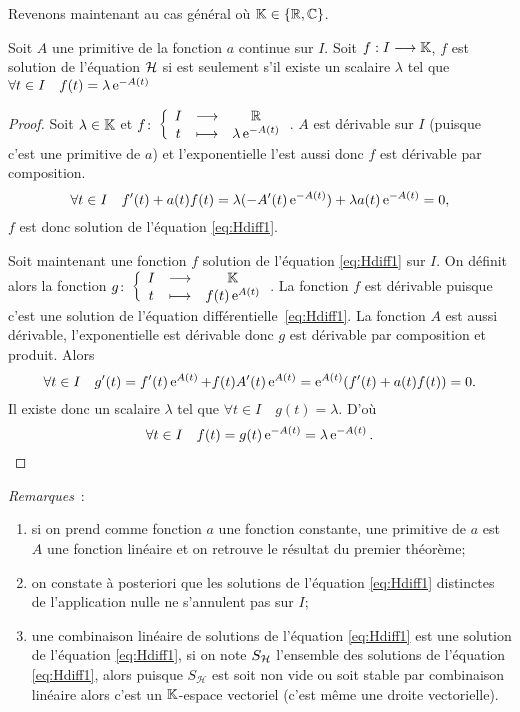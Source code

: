 Revenons maintenant au cas général où $\mathbb{K} \in \{\mathbb{R}, \mathbb{C}\}$.
%
\begin{theo}\label{theo:2}
Soit $A$ une primitive de la fonction $a$ continue sur $I$. Soit $f:I \longrightarrow \mathbb{K}$, $f$ est solution de l'équation $\mathcal{H}$ si est seulement s'il existe un scalaire $\lambda$ tel que $\forall t \in I \quad f(t)=\lambda \operatorname{e}^{-A(t)}$
\end{theo}
\begin{proof}
Soit $\lambda \in \mathbb{K}$ et $f\colon \left\{\begin{array}{ccc} I & \longrightarrow &\mathbb{R}\\ t & \longmapsto & \lambda \operatorname{e}^{-A(t)} \end{array} \right.$. $A$ est dérivable sur $I$ (puisque c'est une primitive de $a$) et l'exponentielle l'est aussi donc $f$ est dérivable par composition.
\begin{equation}
\forall t \in I \quad f'(t)+a(t)f(t)=\lambda(-A'(t)\operatorname{e}^{-A(t)}) + \lambda a(t)\operatorname{e}^{-A(t)}=0,
\end{equation}
$f$ est donc solution de l'équation \eqref{eq:Hdiff1}.

Soit maintenant une fonction $f$ solution de l'équation \eqref{eq:Hdiff1} sur $I$. On définit alors la fonction $g\colon \left\{\begin{array}{ccc} I & \longrightarrow &\mathbb{K}\\ t & \longmapsto & f(t)\operatorname{e}^{A(t)} \end{array} \right.$. La fonction $f$ est dérivable puisque c'est une solution de l'équation différentielle~\eqref{eq:Hdiff1}. La fonction  $A$ est aussi dérivable, l'exponentielle est dérivable donc $g$ est dérivable par composition et produit. Alors
\begin{equation}
\forall t \in I \quad g'(t)=f'(t) \operatorname{e}^{A(t)} + f(t)A'(t)\operatorname{e}^{A(t)}=\operatorname{e}^{A(t)}(f'(t) + a(t)f(t)) =0.
\end{equation}
Il existe donc un scalaire $\lambda$ tel que $\forall t \in I \quad g(t)=\lambda$. D'où 
\begin{equation} 
\forall t \in I \quad f(t)=g(t) \operatorname{e}^{-A(t)}=\lambda \operatorname{e}^{-A(t)}.
\end{equation}
\end{proof}

\emph{Remarques}~:
\begin{enumerate}
\item si on prend comme fonction $a$ une fonction constante, une primitive de $a$ est $A$ une fonction linéaire et on retrouve le résultat du premier théorème;
\item on constate à posteriori que les solutions de l'équation \eqref{eq:Hdiff1} distinctes de l'application nulle ne s'annulent pas sur $I$;
\item une combinaison linéaire de solutions de l'équation \eqref{eq:Hdiff1} est une solution de l'équation \eqref{eq:Hdiff1}, si on note $S_{\mathcal{H}} $ l'ensemble des solutions de l'équation \eqref{eq:Hdiff1}, alors puisque $S_\mathcal{H} $ est soit non vide ou soit stable par combinaison linéaire alors c'est un $\mathbb{K}$-espace vectoriel (c'est même une droite vectorielle).
\end{enumerate}

